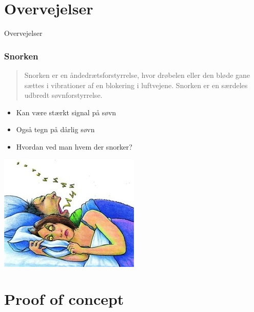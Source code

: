 \section{Overvejelser}

\begin{frame}
	\centering
	Overvejelser
\end{frame}

\begin{frame}
\frametitle{Snorken}
	\begin{quote}
	Snorken er en åndedrætsforstyrrelse, hvor drøbelen eller den bløde gane sættes i vibrationer af en blokering i luftvejene.
	Snorken er en særdeles udbredt søvnforstyrrelse.
	\end{quote}	

	\begin{itemize}
		\item Kan være stærkt signal på søvn
		\item Også tegn på dårlig søvn
		\item Hvordan ved man hvem der snorker?
	\end{itemize}
	\centering
	\includegraphics[scale=0.4]{snorken}
\end{frame}

\section{Proof of concept}

